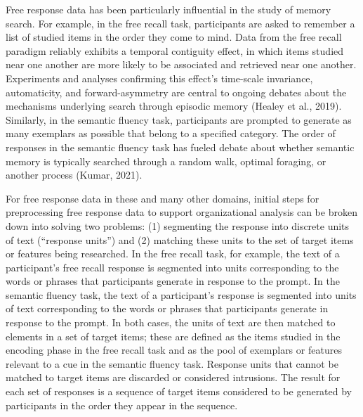 \documentclass[
  letterpaper,
  DIV=11,
  numbers=noendperiod]{scrreprt}
\begin{document}
Free response data has been particularly influential in the study of
memory search. For example, in the free recall task, participants are
asked to remember a list of studied items in the order they come to
mind. Data from the free recall paradigm reliably exhibits a temporal
contiguity effect, in which items studied near one another are more
likely to be associated and retrieved near one another. Experiments and
analyses confirming this effect's time-scale invariance, automaticity,
and forward-asymmetry are central to ongoing debates about the
mechanisms underlying search through episodic memory (Healey et al.,
2019). Similarly, in the semantic fluency task, participants are
prompted to generate as many exemplars as possible that belong to a
specified category. The order of responses in the semantic fluency task
has fueled debate about whether semantic memory is typically searched
through a random walk, optimal foraging, or another process (Kumar,
2021).

For free response data in these and many other domains, initial steps
for preprocessing free response data to support organizational analysis
can be broken down into solving two problems: (1) segmenting the
response into discrete units of text (``response units'') and (2)
matching these units to the set of target items or features being
researched. In the free recall task, for example, the text of a
participant's free recall response is segmented into units corresponding
to the words or phrases that participants generate in response to the
prompt. In the semantic fluency task, the text of a participant's
response is segmented into units of text corresponding to the words or
phrases that participants generate in response to the prompt. In both
cases, the units of text are then matched to elements in a set of target
items; these are defined as the items studied in the encoding phase in
the free recall task and as the pool of exemplars or features relevant
to a cue in the semantic fluency task. Response units that cannot be
matched to target items are discarded or considered intrusions. The
result for each set of responses is a sequence of target items
considered to be generated by participants in the order they appear in
the sequence.
\end{document}
